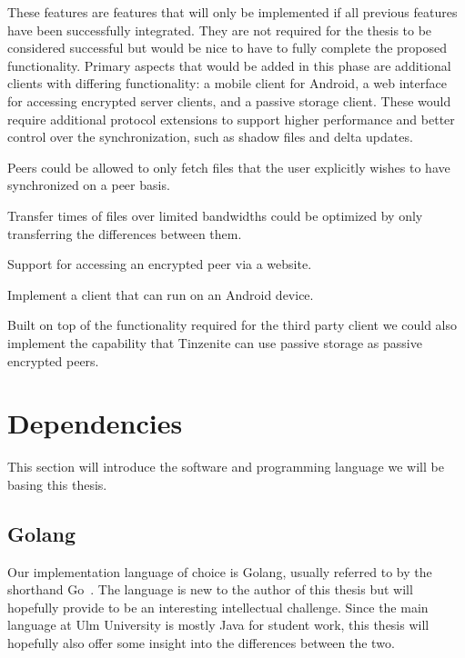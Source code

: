 These features are features that will only be implemented if all previous features have been successfully integrated.
They are not required for the thesis to be considered successful but would be nice to have to fully complete the proposed functionality.
Primary aspects that would be added in this phase are additional clients with differing functionality: a mobile client for Android, a web interface for accessing encrypted server clients, and a passive storage client.
These would require additional protocol extensions to support higher performance and better control over the synchronization, such as shadow files and delta updates.

\begin{description}[leftmargin=7.5em,style=nextline,noitemsep,nolistsep]
\item[Shadow Files]
    Peers could be allowed to only fetch files that the user explicitly wishes to have synchronized on a peer basis.
\item[Delta Updates]
    Transfer times of files over limited bandwidths could be optimized by only transferring the differences between them.
\item[Web Interface]
    Support for accessing an encrypted peer via a website.
\item[Mobile Client]
    Implement a client that can run on an Android device.
\item[Passive Peer]
    Built on top of the functionality required for the third party client we could also implement the capability that Tinzenite can use passive storage as passive encrypted peers.
\end{description}

\section{Dependencies}
\label{sec:Dependencies}

This section will introduce the software and programming language we will be basing this thesis.

\subsection{Golang}
\label{sub:Golang}

Our implementation language of choice is Golang, usually referred to by the shorthand Go~\cite{web:site:golang}.
The language is new to the author of this thesis but will hopefully provide to be an interesting intellectual challenge.
Since the main language at Ulm University is mostly Java for student work, this thesis will hopefully also offer some insight into the differences between the two.


